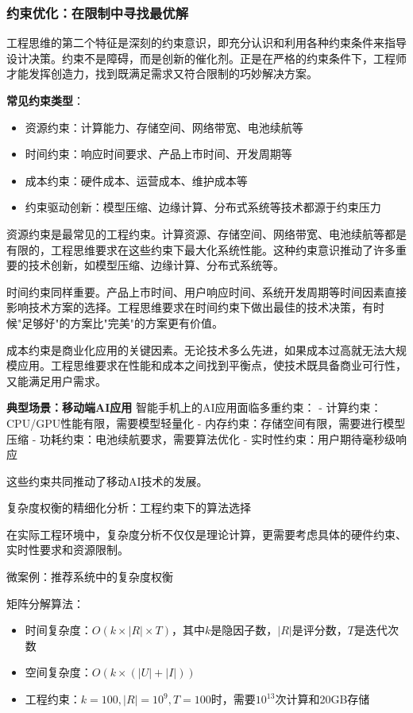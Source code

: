 \subsubsection{约束优化：在限制中寻找最优解}

工程思维的第二个特征是深刻的约束意识，即充分认识和利用各种约束条件来指导设计决策。约束不是障碍，而是创新的催化剂。正是在严格的约束条件下，工程师才能发挥创造力，找到既满足需求又符合限制的巧妙解决方案。

 \textbf{常见约束类型}：
\begin{itemize}
 \item 资源约束：计算能力、存储空间、网络带宽、电池续航等
 \item 时间约束：响应时间要求、产品上市时间、开发周期等
 \item 成本约束：硬件成本、运营成本、维护成本等
 \item 约束驱动创新：模型压缩、边缘计算、分布式系统等技术都源于约束压力
\end{itemize}

资源约束是最常见的工程约束。计算资源、存储空间、网络带宽、电池续航等都是有限的，工程思维要求在这些约束下最大化系统性能。这种约束意识推动了许多重要的技术创新，如模型压缩、边缘计算、分布式系统等。

时间约束同样重要。产品上市时间、用户响应时间、系统开发周期等时间因素直接影响技术方案的选择。工程思维要求在时间约束下做出最佳的技术决策，有时候"足够好"的方案比"完美"的方案更有价值。

成本约束是商业化应用的关键因素。无论技术多么先进，如果成本过高就无法大规模应用。工程思维要求在性能和成本之间找到平衡点，使技术既具备商业可行性，又能满足用户需求。

\textbf{典型场景：移动端AI应用}
智能手机上的AI应用面临多重约束：
- 计算约束：CPU/GPU性能有限，需要模型轻量化
- 内存约束：存储空间有限，需要进行模型压缩
- 功耗约束：电池续航要求，需要算法优化
- 实时性约束：用户期待毫秒级响应

这些约束共同推动了移动AI技术的发展。

 
复杂度权衡的精细化分析：工程约束下的算法选择

在实际工程环境中，复杂度分析不仅仅是理论计算，更需要考虑具体的硬件约束、实时性要求和资源限制。

微案例：推荐系统中的复杂度权衡

矩阵分解算法：
\begin{itemize}
\item 时间复杂度：$O(k \times |R| \times T)$，其中$k$是隐因子数，$|R|$是评分数，$T$是迭代次数
\item 空间复杂度：$O(k \times (|U| + |I|))$
\item 工程约束：$k=100, |R|=10^9, T=100$时，需要$10^{13}$次计算和20GB存储
\end{itemize}

